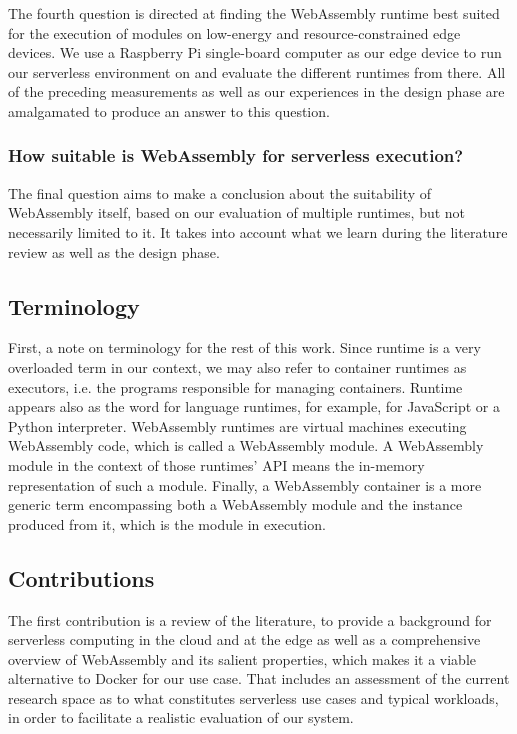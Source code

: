 The fourth question is directed at finding the WebAssembly runtime best suited for the execution of modules on low-energy and resource-constrained edge devices. We use a Raspberry Pi single-board computer as our edge device to run our serverless environment on and evaluate the different runtimes from there. All of the preceding measurements as well as our experiences in the design phase are amalgamated to produce an answer to this question.

\subsubsection*{How suitable is WebAssembly for serverless execution?}

The final question aims to make a conclusion about the suitability of WebAssembly itself, based on our evaluation of multiple runtimes, but not necessarily limited to it. It takes into account what we learn during the literature review as well as the design phase.

\subsection{Terminology}

First, a note on terminology for the rest of this work. Since runtime is a very overloaded term in our context, we may also refer to container runtimes as executors, i.e. the programs responsible for managing containers. Runtime appears also as the word for language runtimes, for example,  for JavaScript or a Python interpreter.
WebAssembly runtimes are virtual machines executing WebAssembly code, which is called a WebAssembly module. A WebAssembly module in the context of those runtimes' API means the in-memory representation of such a module. Finally, a WebAssembly container is a more generic term encompassing both a WebAssembly module and the instance produced from it, which is the module in execution.

\subsection{Contributions}

The first contribution is a review of the literature, to provide a background for serverless computing in the cloud and at the edge as well as a comprehensive overview of WebAssembly and its salient properties, which makes it a viable alternative to Docker for our use case. That includes an assessment of the current research space as to what constitutes serverless use cases and typical workloads, in order to facilitate a realistic evaluation of our system.

